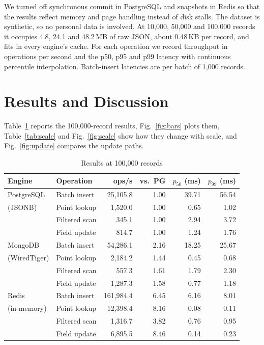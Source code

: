 \documentclass[conference,a4paper]{IEEEtran}
\begin{document}
We turned off synchronous commit in PostgreSQL and snapshots in Redis so that the results reflect memory and page handling instead of disk stalls. The dataset is synthetic, so no personal data is involved. At 10,000, 50,000 and 100,000 records it occupies 4.8, 24.1 and 48.2\,MB of raw JSON, about 0.48\,KB per record, and fits in every engine's cache. For each operation we record throughput in operations per second and the p50, p95 and p99 latency with continuous percentile interpolation. Batch-insert latencies are per batch of 1,000 records.

\section{Results and Discussion}
Table~\ref{tab:results} reports the 100,000-record results, Fig.~\ref{fig:bars} plots them, Table~\ref{tab:scale} and Fig.~\ref{fig:scale} show how they change with scale, and Fig.~\ref{fig:update} compares the update paths.

\begin{table}[t]
\caption{Results at 100,000 records}
\label{tab:results}
\centering
\footnotesize
\setlength{\tabcolsep}{3.5pt}
\begin{tabular}{@{}llrrrr@{}}
\toprule
Engine & Operation & ops/s & vs.\ PG & $p_{50}$ (ms) & $p_{99}$ (ms) \\
\midrule
PostgreSQL & Batch insert & 25,105.8 & 1.00 & 39.71 & 56.54 \\
(JSONB)    & Point lookup & 1,520.0 & 1.00 & 0.65 & 1.02 \\
           & Filtered scan & 345.1 & 1.00 & 2.94 & 3.72 \\
           & Field update & 814.7 & 1.00 & 1.24 & 1.76 \\
\midrule
MongoDB    & Batch insert & 54,286.1 & 2.16 & 18.25 & 25.67 \\
(WiredTiger) & Point lookup & 2,184.2 & 1.44 & 0.45 & 0.68 \\
           & Filtered scan & 557.3 & 1.61 & 1.79 & 2.30 \\
           & Field update & 1,287.3 & 1.58 & 0.77 & 1.18 \\
\midrule
Redis      & Batch insert & 161,984.4 & 6.45 & 6.16 & 8.01 \\
(in-memory) & Point lookup & 12,398.4 & 8.16 & 0.08 & 0.11 \\
           & Filtered scan & 1,316.7 & 3.82 & 0.76 & 0.95 \\
           & Field update & 6,895.5 & 8.46 & 0.14 & 0.23 \\
\bottomrule
\end{tabular}
\end{table}
\end{document}
